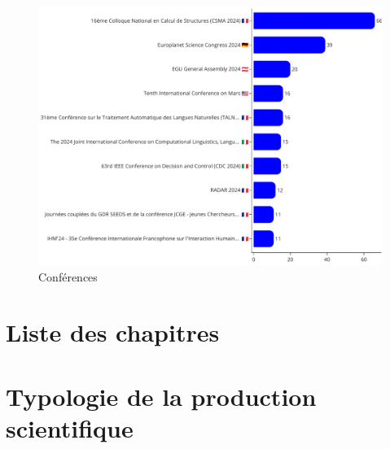 \documentclass[french, 11pt]{dibiso/biso}
\begin{document}
\begin{figure}[!h]
  \includegraphics[width=\textwidth]{figures/conferences.pdf}
  \centering
  \caption{Conférences}
  \label{fig_conferences}
\end{figure}








\pagebreak

\section{Liste des chapitres}

{
  \footnotesize
  
}







\pagebreak

\section{Typologie de la production scientifique}
\end{document}
